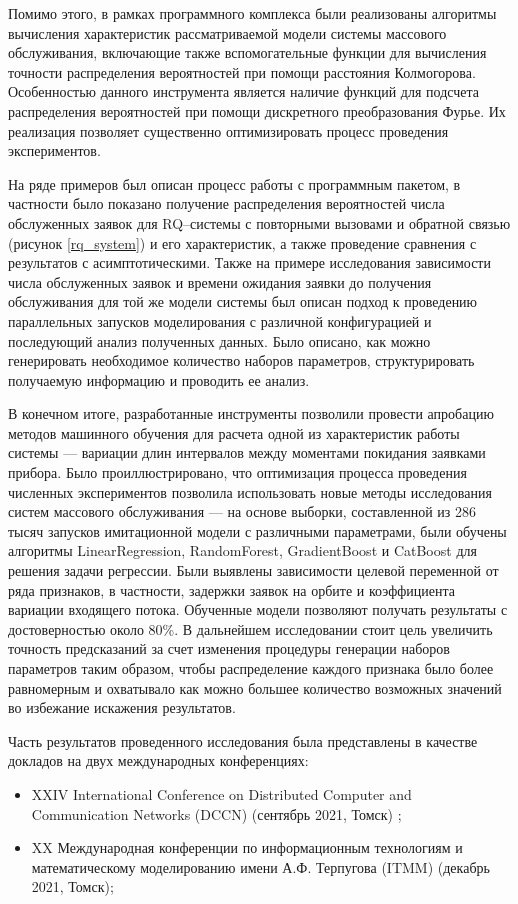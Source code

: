 Помимо этого, в рамках программного комплекса были реализованы алгоритмы вычисления характеристик рассматриваемой модели системы массового обслуживания, включающие также вспомогательные функции для вычисления точности распределения вероятностей при помощи расстояния Колмогорова. Особенностью данного инструмента является наличие функций для подсчета распределения вероятностей при помощи дискретного преобразования Фурье. Их реализация позволяет существенно оптимизировать процесс проведения экспериментов.

На ряде примеров был описан процесс работы с программным пакетом, в частности было показано получение распределения вероятностей числа обслуженных заявок для RQ--системы с повторными вызовами и обратной связью (рисунок \ref{rq_system}) и его характеристик, а также проведение сравнения с результатов с асимптотическими. Также на примере исследования зависимости числа обслуженных заявок и времени ожидания заявки до получения обслуживания для той же модели системы был описан подход к проведению параллельных запусков моделирования с различной конфигурацией и последующий анализ полученных данных. Было описано, как можно генерировать необходимое количество наборов параметров, структурировать получаемую информацию и проводить ее анализ.

В конечном итоге, разработанные инструменты позволили провести апробацию методов машинного обучения для расчета одной из характеристик работы системы --- вариации длин интервалов между моментами покидания заявками прибора. Было проиллюстрировано, что оптимизация процесса проведения численных экспериментов позволила использовать новые методы исследования систем массового обслуживания --- на основе выборки, составленной из 286 тысяч запусков имитационной модели с различными параметрами, были обучены алгоритмы LinearRegression, RandomForest, GradientBoost и CatBoost для решения задачи регрессии. Были выявлены зависимости целевой переменной от ряда признаков, в частности, задержки заявок на орбите и коэффициента вариации входящего потока. Обученные модели позволяют получать результаты с достоверностью около 80\%. В дальнейшем исследовании стоит цель увеличить точность предсказаний за счет изменения процедуры генерации наборов параметров таким образом, чтобы распределение каждого признака было более равномерным и охватывало как можно большее количество возможных значений во избежание искажения результатов.

Часть результатов проведенного исследования была представлены в качестве докладов на двух международных конференциях:
\begin{itemize}
	\item XXIV International Conference on Distributed Computer and Communication Networks (DCCN) (сентябрь 2021, Томск) \cite{blaginin2021approximation};
	\item XX Международная конференции по информационным технологиям и математическому моделированию имени А.Ф. Терпугова (ITMM) (декабрь 2021, Томск);
\end{itemize}

 \clearpage